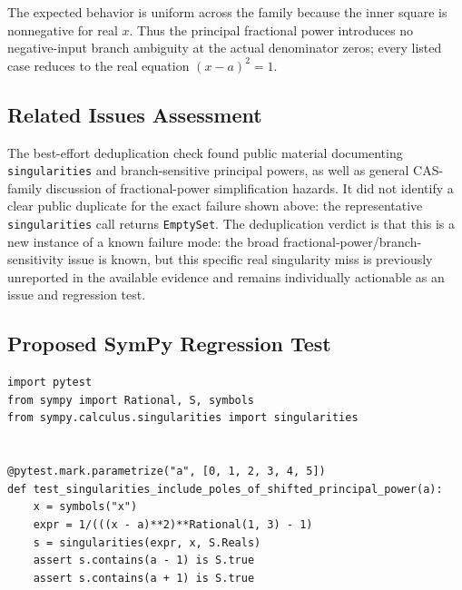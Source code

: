 \documentclass[11pt]{article}
\begin{document}
The expected behavior is uniform across the family because the inner square is
nonnegative for real \(x\). Thus the principal fractional power introduces no
negative-input branch ambiguity at the actual denominator zeros; every listed
case reduces to the real equation \((x-a)^2=1\).

\subsection{Related Issues Assessment}

The best-effort deduplication check found public material documenting
\texttt{singularities} and branch-sensitive principal powers, as well as
general CAS-family discussion of fractional-power simplification hazards. It
did not identify a clear public duplicate for the exact failure shown above:
the representative \texttt{singularities} call returns \texttt{EmptySet}. The
deduplication verdict is that this is a new instance of a known failure mode:
the broad fractional-power/branch-sensitivity issue is known, but this specific
real singularity miss is previously unreported in the available evidence and
remains individually actionable as an issue and regression test.

\subsection{Proposed SymPy Regression Test}

\medskip

\begin{lstlisting}[style=bugpython]
import pytest
from sympy import Rational, S, symbols
from sympy.calculus.singularities import singularities


@pytest.mark.parametrize("a", [0, 1, 2, 3, 4, 5])
def test_singularities_include_poles_of_shifted_principal_power(a):
    x = symbols("x")
    expr = 1/(((x - a)**2)**Rational(1, 3) - 1)
    s = singularities(expr, x, S.Reals)
    assert s.contains(a - 1) is S.true
    assert s.contains(a + 1) is S.true
\end{lstlisting}
\end{document}
